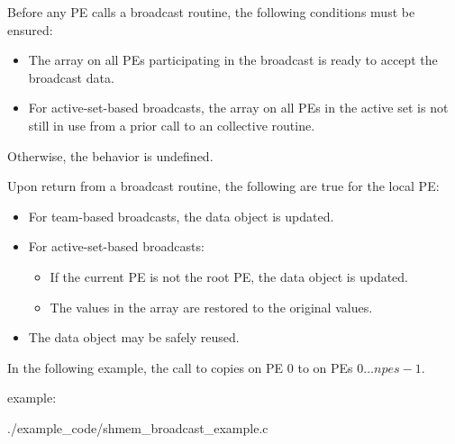 \begin{apidefinition}
{    Before any \ac{PE} calls a broadcast routine, the following
    conditions must be ensured:
    \begin{itemize}
    \item The \dest{} array on all \acp{PE} participating in the broadcast
      is ready to accept the broadcast data.
    \item For active-set-based broadcasts, the
       array on all \acp{PE} in the
      active set is not still in use from a prior call to an \openshmem
      collective routine.
    \end{itemize}
    Otherwise, the behavior is undefined.

    Upon return from a broadcast routine, the following are true for the local
    \ac{PE}:
    \begin{itemize}
    \item For team-based broadcasts, the \dest{} data object is
      updated.
    \item For active-set-based broadcasts:
      \begin{itemize}
      \item If the current \ac{PE} is not the root \ac{PE}, the
        \dest{} data object is updated.
      \item The values in the  array are restored to the
        original values.
      \end{itemize}
    \item The \source{} data object may be safely reused.
    \end{itemize}
}




\begin{apiexamples}

\apicexample
    {In the following \Cstd[11] example, the call to  copies \source{}
    on \ac{PE} $0$ to \dest{} on \acp{PE} $0\dots npes-1$.

    \CorCpp{} example:}
    {./example_code/shmem_broadcast_example.c}
    {}

\end{apiexamples}

\end{apidefinition}
